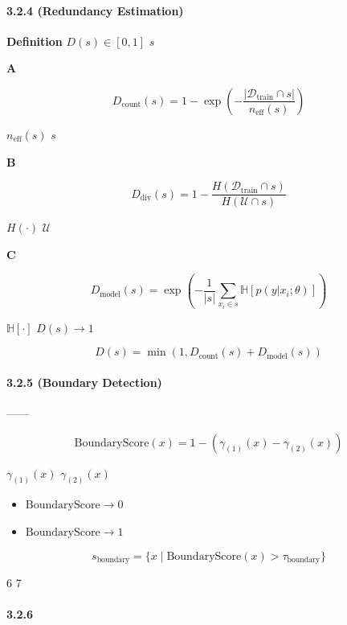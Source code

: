 \documentclass[
  12pt,
]{article}
\providecommand{\tightlist}{%
  \setlength{\itemsep}{0pt}\setlength{\parskip}{0pt}}
\begin{document}
\paragraph{3.2.4  (Redundancy
Estimation)}\label{ux5197ux4f59ux5ea6ux4f30ux8ba1-redundancy-estimation}

\textbf{Definition} \(D(s) \in [0,1]\)  \(s\)


\textbf{ A}

\[
D_{\text{count}}(s) = 1 - \exp\left(-\frac{|\mathcal{D}_{\text{train}} \cap s|}{n_{\text{eff}}(s)}\right)
\]

 \(n_{\text{eff}}(s)\)  \(s\)


\textbf{ B}

\[
D_{\text{div}}(s) = 1 - \frac{H(\mathcal{D}_{\text{train}} \cap s)}{H(\mathcal{U} \cap s)}
\]

 \(H(\cdot)\)
\(\mathcal{U}\)


\textbf{ C}

\[
D_{\text{model}}(s) = \exp\left(- \frac{1}{|s|} \sum_{x_i \in s} \mathbb{H}[p(y|x_i; \theta)] \right)
\]

 \(\mathbb{H}[\cdot]\)
\(D(s) \to 1\)

\textbf{}

\[
D(s) = \min(1, D_{\text{count}}(s) + D_{\text{model}}(s))
\]

\paragraph{3.2.5  (Boundary
Detection)}\label{ux8fb9ux754cux68c0ux6d4b-boundary-detection}

------

\textbf{}

\[
\text{BoundaryScore}(x) = 1 - (\gamma_{(1)}(x) - \gamma_{(2)}(x))
\]

 \(\gamma_{(1)}(x)\)  \(\gamma_{(2)}(x)\) 

\begin{itemize}
\tightlist
\item
  \(\text{BoundaryScore} \to 0\)
\item
  \(\text{BoundaryScore} \to 1\)
\end{itemize}

\textbf{}

\[
s_{\text{boundary}} = \{ x \mid \text{BoundaryScore}(x) > \tau_{\text{boundary}} \}
\]

 6 7

\paragraph{3.2.6 }\label{ux56dbux5206ux7c7bux89c4ux5219}
\end{document}
